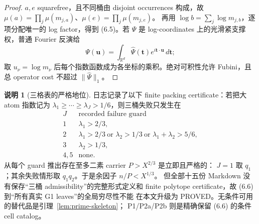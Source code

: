\documentclass[11pt,a4paper]{ctexart}
\theoremstyle{definition}
\newtheorem{remark}[theorem]{说明}
\newcommand{\1}{\mathbf 1}
\newcommand{\PROVED}{\textcolor{green!45!black}{\textsf{PROVED}}}
\begin{document}
\begin{proof}
$a,e$ squarefree，且不同桶由 disjoint occurrences 构成，故
$\mu(a)=\prod_j\mu(m_{j,a})$、$\mu(e)=\prod_j\mu(m_{j,e})$。
再用 $\log b=\sum_j\log m_{j,b}$，逐项分配唯一的 log factor，得到
(6.5)。若 $\Psi$ 是 log-coordinates 上的光滑紧支撑权，普通 Fourier 反演给
\[
\Psi(\mathbf u)=\int_{\mathbb R^d}\widehat\Psi(\mathbf t)
  e^{i\mathbf t\cdot\mathbf u}\,d\mathbf t;
\]
取 $u_\nu=\log m_\nu$ 后每个指数函数成为各坐标的乘积。绝对可积性允许
Fubini，且总 operator cost 不超过 $\|\widehat\Psi\|_1$。
\end{proof}

\begin{remark}[三格表的严格地位]\label{rem:pack3}
日志记录了以下 finite packing certificate：若把大 atom 指数记为
$\lambda_1\ge\cdots\ge\lambda_J>1/6$，则三桶失败只发生在
\[
\begin{array}{c|l}
J&\text{recorded failure guard}\\ \hline
1&\lambda_1>2/3,\\
2&\lambda_1>2/3\ \text{or }\lambda_2>1/3\ \text{or }
   \lambda_1+\lambda_2>5/6,\\
3&\lambda_2>1/3,\\
4,5&\text{none}.
\end{array}                                             \tag{6.6}
\]
从每个 guard 推出存在至多二素 carrier $P>X^{2/3}$ 是立即且严格的：
$J=1$ 取 $q_1$；其余失败情形取 $q_1q_2$。于是余因子 $n/P<X^{1/3}$。
但全部十五份 Markdown 没有保存“三桶 admissibility”的完整形式定义和 finite
polytope certificate，故 (6.6) 到“所有真实 G1 leaves”的全局穷尽性不能
在本文升级为 \PROVED。无条件可用的替代品是引理~\ref{lem:prime-skeleton}；
P1/P2a/P2b 则是精确保留 (6.6) 的条件 cell catalog。
\end{remark}
\end{document}
